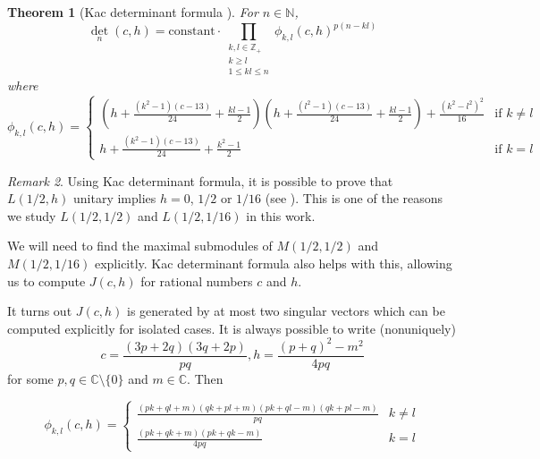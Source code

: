 \documentclass[a4paper, 12pt, reqno]{amsart}
\newtheorem{theorem}{Theorem}[subsection]
\theoremstyle{remark}
\newtheorem{remark}[theorem]{Remark}
\numberwithin{equation}{subsection}
\begin{document}
\begin{theorem}[Kac determinant formula {\cite[Theorem 4.2]{iohara_representation_2011}}]
  \label{thr:28}
  For $n \in \mathbb{N}$,
  \begin{equation*}
    \textstyle\det_n(c, h) = \displaystyle\text{constant}\cdot \prod_{\substack{k, l \in \mathbb{Z}_+\\k \ge l\\ 1 \le kl \le n}} \phi_{k, l}(c, h)^{p(n - kl)}
  \end{equation*}
  where
  \begin{equation*}
    \phi_{k, l}(c, h)=
    \begin{cases}
      (h + \frac{(k^2 - 1)(c - 13)}{24} + \frac{kl - 1}{2})(h + \frac{(l^2 - 1)(c - 13)}{24} + \frac{kl - 1}{2}) + \frac{(k^2 - l^2)^2}{16} & \text{if }k \neq l\\
      h + \frac{(k^2 - 1)(c - 13)}{24} + \frac{k^2 - 1}{2} & \text{if }k = l
    \end{cases}
  \end{equation*}
\end{theorem}

\begin{remark}
  \label{rmk:23}
  Using Kac determinant formula, it is possible to prove that $L(1/2, h)$ unitary implies $h = 0$, $1/2$ or $1/16$ (see \cite[\S3]{kac_bombay_2013}).
  This is one of the reasons we study $L(1/2, 1/2)$ and $L(1/2, 1/16)$ in this work.
\end{remark}

We will need to find the maximal submodules of $M(1/2, 1/2)$ and $M(1/2, 1/16)$ explicitly.
Kac determinant formula also helps with this, allowing us to compute $J(c, h)$ for rational numbers $c$ and $h$.

It turns out $J(c, h)$ is generated by at most two singular vectors which can be computed explicitly for isolated cases.
It is always possible to write (nonuniquely)
\begin{equation*}
  c = \frac{(3p + 2q)(3q + 2p)}{pq}, h = \frac{(p + q)^2 - m^2}{4pq}
\end{equation*}
for some $p,q\in \mathbb{C}\setminus\{0\}$ and $m\in \mathbb{C}$.
Then

\begin{equation*}
  \phi_{k, l}(c, h) =
  \begin{cases}
    \frac{(pk + ql + m)(qk + pl + m)(pk + ql - m)(qk + pl - m)}{pq} & k \neq l\\
    \frac{(pk + qk + m)(pk + qk - m)}{4pq} & k = l
  \end{cases}
\end{equation*}
\end{document}
